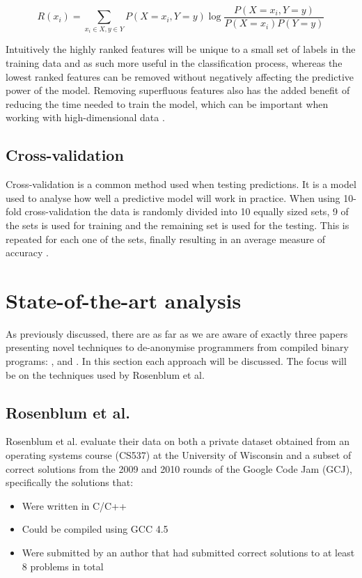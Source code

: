 \documentclass[a4paper,11pt]{kth-mag}
\begin{document}
$$R(x_i)= \sum_{x_i \in X, y \in Y} P(X=x_i,Y=y) \log \frac{P(X = x_i,
Y = y)}{P(X = x_i)P(Y = y)}$$

Intuitively the highly ranked features will be unique to a small set of 
labels in the training data and as such more useful in the classification
process, whereas the lowest ranked features can be removed without negatively
affecting the predictive power of the model. Removing superfluous features also
has the added benefit of reducing the time needed to train the model, which can
be important when working with high-dimensional data
\parencite{guyon2003introduction}.

\subsection{Cross-validation}
Cross-validation is a common method used when testing predictions. It is a
model used to analyse how well a predictive model will work in practice. When
using 10-fold cross-validation the data is randomly divided into 10 equally
sized sets, 9 of the sets is used for training and the remaining set is used
for the testing. This is repeated for each one of the sets, finally resulting
in an average measure of accuracy \parencite{hsu2003practical}.        

\section{State-of-the-art analysis}
As previously discussed, there are as far as we are aware of exactly three
papers presenting novel techniques to de-anonymise programmers from compiled
binary programs: \parencite{rosenblum2011wrote}, \parencite{alrabaee2014oba2}
and \parencite{caliskan2015coding}. In this section each approach will be discussed.
The focus will be on the techniques used by Rosenblum et al.

\subsection{Rosenblum et al.}
Rosenblum et al. evaluate their data on both a private dataset obtained from
an operating systems course (CS537) at the University of Wisconsin and a subset
of correct solutions from the 2009 and 2010 rounds of the Google Code Jam
(GCJ), specifically the solutions that:

\begin{itemize}
\item Were written in C/C++
\item Could be compiled using GCC 4.5 
\item Were submitted by an author that had submitted correct solutions to at
      least 8 problems in total
\end{itemize}
\end{document}
